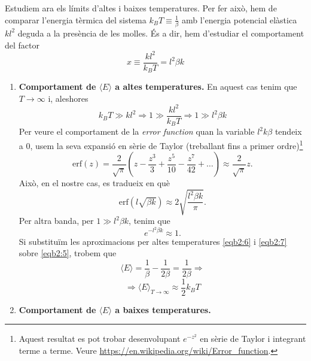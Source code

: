 \documentclass[a4paper, 10pt]{article}
\begin{document}
\begin{enumerate}
Estudiem ara els límits d'altes i baixes temperatures. Per fer això, hem de comparar l'energia tèrmica del sistema $k_BT \equiv \frac{1}{\beta}$ amb l'energia potencial elàstica $kl^2$ deguda a la presència de les molles. És a dir, hem d'estudiar el comportament del factor
\begin{equation}
	x \equiv \frac{kl^2}{k_BT} = l^2\beta k \label{eqb2:9}
\end{equation}
\begin{enumerate}
	\item \textbf{Comportament de $\langle E \rangle$ a altes temperatures.} En aquest cas tenim que $T \rightarrow \infty$ i, aleshores
	\begin{equation*}
		k_BT \gg kl^2 \Rightarrow 1 \gg \frac{kl^2}{k_BT} \Rightarrow 1 \gg l^2\beta k
	\end{equation*}
	Per veure el comportament de la \textit{error function} quan la variable $l^2k\beta$ tendeix a 0, usem la seva expansió en sèrie de Taylor (treballant fins a primer ordre)\footnote{Aquest resultat es pot trobar desenvolupant $e^{-z^2}$ en sèrie de Taylor i integrant terme a terme. Veure \url{https://en.wikipedia.org/wiki/Error_function}.}
	\begin{equation}
		\mathrm{erf}(z) = \frac{2}{\sqrt{\pi}}\left(z-\frac{z^3}{3}+\frac{z^5}{10}-\frac{z^7}{42}+\ldots\right) \approx \frac{2}{\sqrt{\pi}}z. \label{eqb2:5}
	\end{equation}
	Això, en el nostre cas, es tradueix en què
	\begin{equation}
		\mathrm{erf}(l\sqrt{\beta k}) \approx 2\sqrt{\frac{l^2\beta k}{\pi}}. \label{eqb2:6}
	\end{equation}
	Per altra banda, per $1 \gg l^2\beta k$, tenim que
	\begin{equation}
		e^{-l^2\beta k} \approx 1. \label{eqb2:7}
	\end{equation}
	Si substituïm les aproximacions per altes temperatures \eqref{eqb2:6} i \eqref{eqb2:7} sobre \eqref{eqb2:5}, trobem que
	\begin{equation*}
		\langle E \rangle = \frac{1}{\beta} - \frac{1}{2\beta} =\frac{1}{2\beta} \Rightarrow
	\end{equation*}
	\begin{equation}
		 \Rightarrow \boxed{\langle E \rangle_{T\rightarrow \infty} \approx \frac{1}{2} k_BT} \label{eqb2:8}
	\end{equation}
	
	\item \textbf{Comportament de $\langle E \rangle$ a baixes temperatures.}
	

\end{enumerate}
\end{enumerate}
\end{document}

